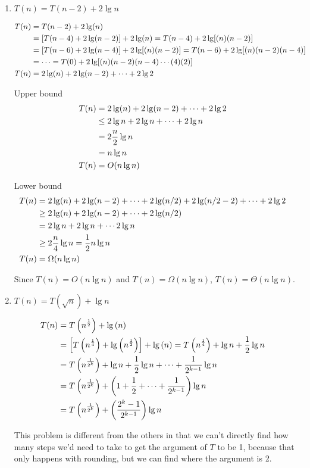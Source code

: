 \begin{enumerate}
	\item	$T(n) = T(n-2) + 2 \lg n$
	
\begin{align*}
	T(n) &= T(n-2) + 2 \lg (n) \cr
	&= \left[ T(n-4) + 2 \lg(n-2) \right] + 2 \lg (n)
	= T(n-4) + 2 \lg[(n)(n-2)] \cr
	&= \left[ T(n-6) + 2\lg(n-4) \right] + 2\lg[(n)(n-2)] 
	= T(n-6) + 2\lg[(n)(n-2)(n-4)] \cr
	&= \cdots = T(0) + 2 \lg[(n)(n-2)(n-4) \cdots (4)(2)] \cr
 	T(n) &= 2 \lg (n) + 2 \lg(n-2) + \cdots + 2 \lg 2 \cr
\end{align*}

Upper bound
\begin{align*}
 	T(n) &= 2 \lg (n) + 2 \lg(n-2) + \cdots + 2 \lg 2 \cr
	&\le 2 \lg n + 2 \lg n + \cdots + 2 \lg n \cr
	&= 2 \frac{n}{2} \lg n \cr
	&= n \lg n \cr
	T(n) &= O(n \lg n) \cr
\end{align*}

Lower bound
\begin{align*}
	T(n) &= 2 \lg (n) + 2 \lg(n-2) + \cdots + 2\lg (n/2) + 2 \lg (n/2 - 2) + \cdots + 2 \lg 2 \cr
	&\ge 2 \lg (n) + 2 \lg(n-2) + \cdots + 2\lg (n/2) \cr
	&= 2 \lg n + 2 \lg n + \cdots 2 \lg n \cr
	&\ge 2 \frac{n}{4} \lg n = \frac{1}{2} n \lg n \cr
	T(n) &= \Omega(n \lg n) \cr
\end{align*}

Since $T(n) = O(n \lg n)$ and $T(n) = \Omega(n \lg n)$, $T(n) = \Theta(n \lg n)$.  	

	\item $T(n) = T(\sqrt{n}) + \lg n$

\begin{align*}
	T(n) &= T\left( n^\frac{1}{2} \right) + \lg \left( n \right) \cr
	&= \left[ T\left( n^\frac{1}{4} \right) + \lg \left( n^\frac{1}{2} \right) \right] + \lg \left( n \right) = T\left( n^\frac{1}{4} \right) + \lg n + \frac{1}{2} \lg n \cr
	&= 	T \left( n^\frac{1}{2^k} \right) + \lg n + \frac{1}{2}\lg n + \cdots + \frac{1}{2^{k-1}} \lg n \cr
	&= T\left( n^\frac{1}{2^k} \right) +  \left( 1 + \frac{1}{2} + \cdots + \frac{1}{2^{k-1}} \right) \lg n \cr
	&= T\left( n^\frac{1}{2^k} \right) +  \left( \frac{2^k - 1}{2^{k-1}}  \right) \lg n\cr
\end{align*}

This problem is different from the others in that we can't directly find how many steps we'd need to take to get the argument of $T$ to be 1, because that only happens with rounding, but we can find where the argument is 2. 


\end{enumerate}
